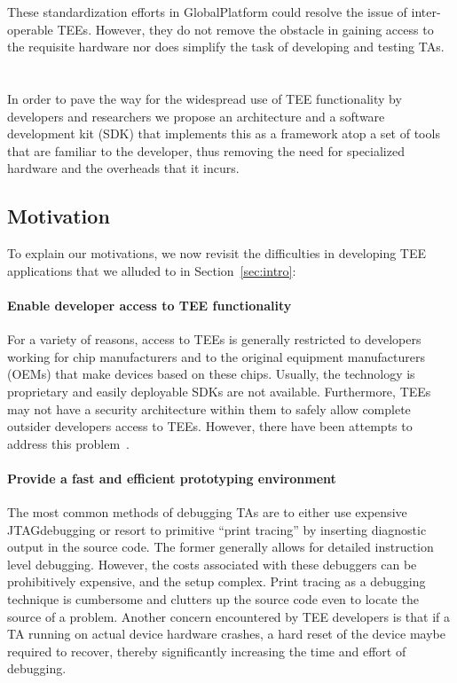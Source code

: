 \documentclass[10pt,conference,letterpaper]{IEEEtran}
\DeclareRobustCommand\sectt[1]{{\fontsize{13}{12}#1}}
\newcommand{\openteesectitle}{\protect\sectt{TEE-Vi}\xspace}
\DeclareRobustCommand\sectt[1]{{\fontsize{13}{12}#1}}
\newcommand{\openteesectitle}{\protect\sectt{Open-TEE}\xspace}
\begin{document}
These standardization efforts in GlobalPlatform could resolve the issue of inter-operable TEEs. However, they do not remove the obstacle in gaining access to the requisite hardware nor does simplify the task of developing and testing TAs.
 
\section{\openteesectitle}
\label{sec:opentee}
In order to pave the way for the widespread use of TEE functionality by developers and researchers we propose an architecture and a software development kit (SDK) that implements this as a framework atop a set of tools that are familiar to the developer, thus removing the need for specialized hardware and the overheads that it incurs.

\subsection{Motivation}
\label{subsec:motivation}

To explain our motivations, we now revisit the difficulties in developing TEE applications that we alluded to in Section~\ref{sec:intro}:
\paragraph{Enable developer access to TEE functionality}
For a variety of reasons, access to TEEs is generally restricted to developers working for chip manufacturers and to the original equipment manufacturers (OEMs) that make devices based on these chips. Usually, the technology is proprietary and easily deployable SDKs are not available. Furthermore, TEEs may not have a security architecture within them to safely allow complete outsider developers access to TEEs. However, there have been attempts to address this problem~\cite{KostiainenEAR09}.

\paragraph{Provide a fast and efficient prototyping environment}
The most common methods of debugging TAs are to either use expensive JTAG\footnotemark debugging or resort to primitive ``print tracing'' by inserting diagnostic output in the source code. The former generally allows for detailed instruction level debugging. However, the costs associated with these debuggers can be prohibitively expensive, and the setup complex.  Print tracing as a debugging technique is cumbersome and clutters up the source code even to locate the source of a problem. Another concern encountered by TEE developers is that if a TA running on actual device hardware crashes, a hard reset of the device maybe required to recover, thereby significantly increasing the time and effort of debugging.
\end{document}
